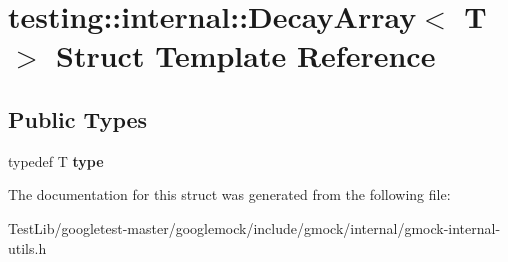 \hypertarget{structtesting_1_1internal_1_1DecayArray}{}\section{testing\+:\+:internal\+:\+:Decay\+Array$<$ T $>$ Struct Template Reference}
\label{structtesting_1_1internal_1_1DecayArray}
\subsection*{Public Types}
\begin{DoxyCompactItemize}
\item 
\mbox{\label{structtesting_1_1internal_1_1DecayArray_a39803f9bafd56bc4531f86eb34fe9c0f}} 
typedef T {\bfseries type}
\end{DoxyCompactItemize}


The documentation for this struct was generated from the following file\+:\begin{DoxyCompactItemize}
\item 
Test\+Lib/googletest-\/master/googlemock/include/gmock/internal/gmock-\/internal-\/utils.\+h\end{DoxyCompactItemize}
